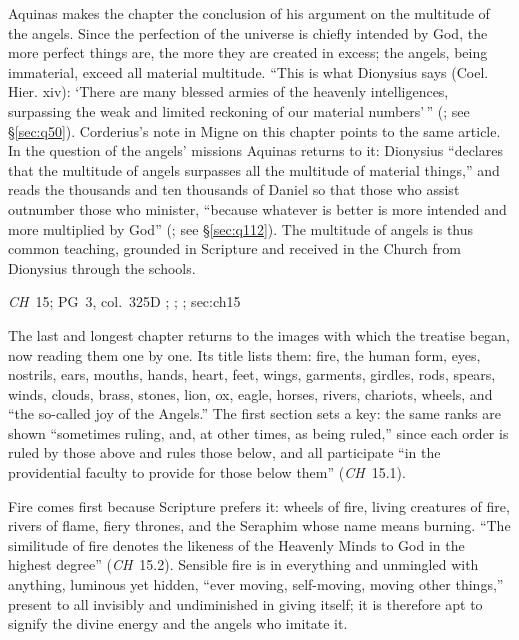 Aquinas makes the chapter the conclusion of his argument on the
multitude of the angels. Since the perfection of the universe is chiefly
intended by God, the more perfect things are, the more they are created
in excess; the angels, being immaterial, exceed all material multitude.
``This is what Dionysius says (Coel. Hier. xiv): `There are many blessed
armies of the heavenly intelligences, surpassing the weak and limited
reckoning of our material numbers'\,'' (; see
\S\ref{sec:q50}). Corderius's note in Migne on this chapter points to the
same article. In the question of the angels' missions Aquinas returns to
it: Dionysius ``declares that the multitude of angels surpasses all the
multitude of material things,'' and reads the thousands and ten
thousands of Daniel so that those who assist outnumber those who
minister, ``because whatever is better is more intended and more
multiplied by God'' (; see \S\ref{sec:q112}). The multitude of angels is
thus common teaching, grounded in Scripture and received in the Church
from Dionysius through the schools.

{\emph{CH}~15; PG~3, col.~325D}
{; ; ; }{sec:ch15}

The last and longest chapter returns to the images with which the
treatise began, now reading them one by one. Its title lists them: fire,
the human form, eyes, nostrils, ears, mouths, hands, heart, feet, wings,
garments, girdles, rods, spears, winds, clouds, brass, stones, lion, ox,
eagle, horses, rivers, chariots, wheels, and ``the so-called joy of the
Angels.'' The first section sets a key: the same ranks are shown
``sometimes ruling, and, at other times, as being ruled,'' since each
order is ruled by those above and rules those below, and all participate
``in the providential faculty to provide for those below them''
(\emph{CH}~15.1).

Fire comes first because Scripture prefers it: wheels of fire, living
creatures of fire, rivers of flame, fiery thrones, and the Seraphim whose
name means burning. ``The similitude of fire denotes the likeness of the
Heavenly Minds to God in the highest degree'' (\emph{CH}~15.2). Sensible
fire is in everything and unmingled with anything, luminous yet hidden,
``ever moving, self-moving, moving other things,'' present to all
invisibly and undiminished in giving itself; it is therefore apt to
signify the divine energy and the angels who imitate it.

